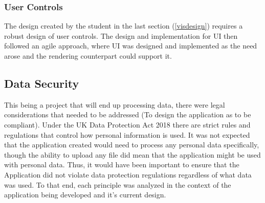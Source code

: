 \subsubsection{User Controls}
The design created by the student in the last section (\ref{visdesign}) requires a robust design of user controls. The design and implementation for UI then followed an agile approach, where UI was designed and implemented as the need arose and the rendering counterpart could support it.

\subsection{Data Security} \label{datasecurity}
This being a project that will end up processing data, there were legal considerations that needed to be addressed (To design the application as to be compliant). Under the UK Data Protection Act 2018 \cite{govuk_2018_data} there are strict rules and regulations that control how personal information is used. It was not expected that the application created would need to process any personal data specifically, though the ability to upload any file did mean that the application might be used with personal data. Thus, it would have been important to ensure that the Application did not violate data protection regulations regardless of what data was used. To that end, each principle was analyzed in the context of the application being developed and it's current design.

